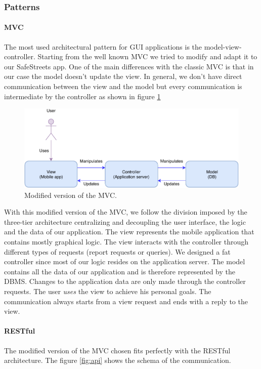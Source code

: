 \documentclass[./main.tex]{subfiles}
\begin{document}
\subsubsection{Patterns}

\paragraph*{MVC}
The most used architectural pattern for GUI applications is the model-view-controller. Starting from the well known MVC we tried to modify and adapt it to our SafeStreets app. One of the main differences with the classic MVC is that in our case the model doesn't update the view. In general, we don't have direct communication between the view and the model but every communication is intermediate by the controller as shown in figure \ref{fig:mmvc}

\begin{figure}[H]
\centering
\includegraphics[width = \textwidth]{resources/Patterns/mmvc}
\caption{Modified version of the MVC.}
\label{fig:mmvc}
\end{figure}

With this modified version of the MVC, we follow the division imposed by the three-tier architecture centralizing and decoupling the user interface, the logic and the data of our application. The view represents the mobile application that contains mostly graphical logic. The view interacts with the controller through different types of requests (report requests or queries). We designed a fat controller since most of our logic resides on the application server. The model contains all the data of our application and is therefore represented by the DBMS. Changes to the application data are only made through the controller requests. The user \textit{uses} the view to achieve his personal goals. The communication always starts from a view request and ends with a reply to the view.

\paragraph*{RESTful}
The modified version of the MVC chosen fits perfectly with the RESTful architecture. The figure \ref{fig:api} shows the schema of the communication.
\end{document}
